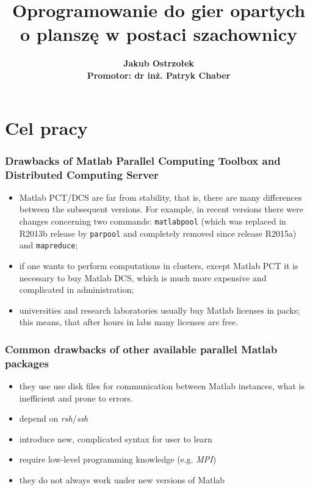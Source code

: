 \documentclass{beamer}
\title[jPar \insertframenumber/\inserttotalframenumber]{Oprogramowanie do gier opartych o planszę w postaci szachownicy}
\author[Jakub Ostrzołek]{\textbf{Jakub Ostrzołek \\%
\footnotesize Promotor: dr inż. Patryk Chaber}}
\institute{Instytut Automatyki i Technik Informacyjnych\\%
Politechnika Warszawska}
\begin{document}
\frame{\titlepage}


\section{Cel pracy}
\begin{frame}
\frametitle{Drawbacks of Matlab Parallel  Computing
Toolbox and Distributed Computing Server}
\begin{itemize}
\item  Matlab PCT/DCS are far from stability, that is, there are
   many differences between the subsequent versions. For example, in recent versions
   there were changes concerning two commands: {\tt matlabpool} (which was replaced
   in R2013b release  by {\tt parpool} and completely removed since release R2015a) and {\tt mapreduce};
\item  if one wants to perform computations in clusters, except Matlab PCT  it is necessary to buy Matlab DCS, which is much more expensive
   and complicated in administration;
\item  universities and research laboratories usually buy Matlab
   licenses in packs; this means, that after hours in labs many licenses
   are free.
\end{itemize}
\end{frame}

\begin{frame}
\frametitle{Common drawbacks of other available parallel Matlab packages}
\begin{itemize}
\item they use use disk files for communication between
Matlab instances, what is inefficient and prone to errors.
\item depend on \emph{rsh}/\emph{ssh}
\item introduce new, complicated syntax for user to learn
\item require low-level programming knowledge (e.g. \emph{MPI})
\item they do not always work under new versions of Matlab
\end{itemize}
\end{frame}
\end{document}
